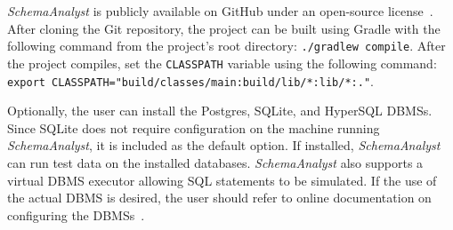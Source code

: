 \textit{SchemaAnalyst} is publicly available on GitHub under an open-source license~\cite{tool}. After cloning the Git
repository, the project can be built using Gradle with the following command from the project's root directory:
\lstinline{./gradlew compile}. After the project compiles, set the \lstinline{CLASSPATH} variable using the following
command: \lstinline{export CLASSPATH="build/classes/main:build/lib/*:lib/*:."}.

Optionally, the user can install the Postgres, SQLite, and HyperSQL DBMSs. Since SQLite does not require configuration
on the machine running \textit{SchemaAnalyst}, it is included as the default option. If installed,
\textit{SchemaAnalyst} can run test data on the installed databases. \textit{SchemaAnalyst} also supports a virtual DBMS
executor allowing SQL statements to be simulated. If the use of the actual DBMS is desired, the user should refer to
online documentation on configuring the DBMSs~\cite{tool}.

